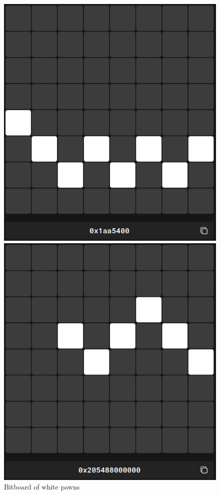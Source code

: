 \begin{figure}[H]
    \begin{minipage}[c]{0.30\textwidth}
        \includegraphics[width=\textwidth]{Imagenes/bitboard_white_pawns.png}
        \caption*{Bitboard of white pawns}
    \end{minipage}
    \hfill
    \begin{minipage}[c]{0.30\textwidth}
        \includegraphics[width=\textwidth]{Imagenes/bitboard_black_pawns.png}

\end{minipage}
\end{figure}
